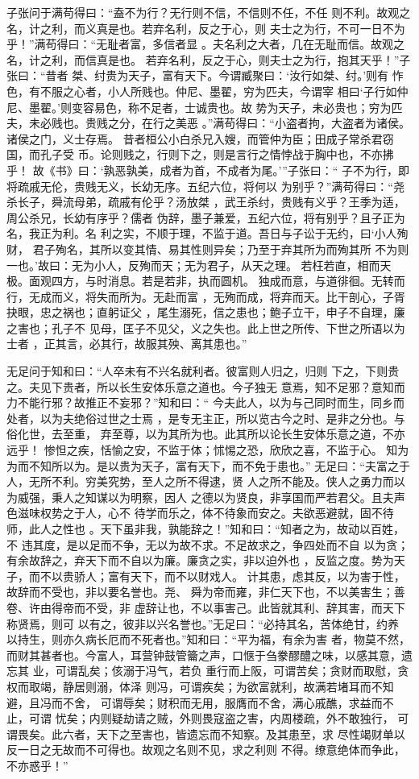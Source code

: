 \documentclass[a4paper,12pt,UTF8,twoside]{ctexbook}
\begin{document}
子张问于满苟得曰：“盍不为行？无行则不信，不信则不任，不任 则不利。故观之名，计之利，而义真是也。若弃名利，反之于心，则 夫士之为行，不可一日不为乎！”满苟得曰：“无耻者富，多信者显 。夫名利之大者，几在无耻而信。故观之名，计之利，而信真是也。 若弃名利，反之于心，则夫士之为行，抱其天乎！”子张曰：“昔者 桀、纣贵为天子，富有天下。今谓臧聚曰：‘汝行如桀、纣。’则有 怍色，有不服之心者，小人所贱也。仲尼、墨翟，穷为匹夫，今谓宰 相曰‘子行如仲尼、墨翟。’则变容易色，称不足者，士诚贵也。故 势为天子，未必贵也；穷为匹夫，未必贱也。贵贱之分，在行之美恶 。”满苟得曰：“小盗者拘，大盗者为诸侯。诸侯之门，义士存焉。 昔者桓公小白杀兄入嫂，而管仲为臣；田成子常杀君窃国，而孔子受 币。论则贱之，行则下之，则是言行之情悖战于胸中也，不亦拂乎！ 故《书》曰：‘孰恶孰美，成者为首，不成者为尾。’”子张曰：“ 子不为行，即将疏戚无伦，贵贱无义，长幼无序。五纪六位，将何以 为别乎？”满苟得曰：“尧杀长子，舜流母弟，疏戚有伦乎？汤放桀 ，武王杀纣，贵贱有义乎？王季为适，周公杀兄，长幼有序乎？儒者 伪辞，墨子兼爱，五纪六位，将有别乎？且子正为名，我正为利。名 利之实，不顺于理，不监于道。吾日与子讼于无约，曰‘小人殉财， 君子殉名，其所以变其情、易其性则异矣；乃至于弃其所为而殉其所 不为则一也。’故曰：无为小人，反殉而天；无为君子，从天之理。 若枉若直，相而天极。面观四方，与时消息。若是若非，执而圆机。 独成而意，与道徘徊。无转而行，无成而义，将失而所为。无赴而富 ，无殉而成，将弃而天。比干剖心，子胥抉眼，忠之祸也；直躬证父 ，尾生溺死，信之患也；鲍子立干，申子不自理，廉之害也；孔子不 见母，匡子不见父，义之失也。此上世之所传、下世之所语以为士者 ，正其言，必其行，故服其殃、离其患也。”

无足问于知和曰：“人卒未有不兴名就利者。彼富则人归之，归则 下之，下则贵之。夫见下贵者，所以长生安体乐意之道也。今子独无 意焉，知不足邪？意知而力不能行邪？故推正不妄邪？”知和曰：“ 今夫此人，以为与己同时而生，同乡而处者，以为夫绝俗过世之士焉 ，是专无主正，所以览古今之时、是非之分也。与俗化世，去至重， 弃至尊，以为其所为也。此其所以论长生安体乐意之道，不亦远乎！ 惨怛之疾，恬愉之安，不监于体；怵惕之恐，欣欣之喜，不监于心。 知为为而不知所以为。是以贵为天子，富有天下，而不免于患也。” 无足曰：“夫富之于人，无所不利。穷美究势，至人之所不得逮，贤 人之所不能及。侠人之勇力而以为威强，秉人之知谋以为明察，因人 之德以为贤良，非享国而严若君父。且夫声色滋味权势之于人，心不 待学而乐之，体不待象而安之。夫欲恶避就，固不待师，此人之性也 。天下虽非我，孰能辞之！”知和曰：“知者之为，故动以百姓，不 违其度，是以足而不争，无以为故不求。不足故求之，争四处而不自 以为贪；有余故辞之，弃天下而不自以为廉。廉贪之实，非以迫外也 ，反监之度。势为天子，而不以贵骄人；富有天下，而不以财戏人。 计其患，虑其反，以为害于性，故辞而不受也，非以要名誉也。尧、 舜为帝而雍，非仁天下也，不以美害生；善卷、许由得帝而不受，非 虚辞让也，不以事害己。此皆就其利、辞其害，而天下称贤焉，则可 以有之，彼非以兴名誉也。”无足曰：“必持其名，苦体绝甘，约养 以持生，则亦久病长厄而不死者也。”知和曰：“平为福，有余为害 者，物莫不然，而财其甚者也。今富人，耳营钟鼓管籥之声，口惬于刍豢醪醴之味，以感其意，遗忘其 业，可谓乱矣；侅溺于冯气，若负 重行而上阪，可谓苦矣；贪财而取慰，贪权而取竭，静居则溺，体泽 则冯，可谓疾矣；为欲富就利，故满若堵耳而不知避，且冯而不舍， 可谓辱矣；财积而无用，服膺而不舍，满心戚醮，求益而不止，可谓 忧矣；内则疑劫请之贼，外则畏寇盗之害，内周楼疏，外不敢独行， 可谓畏矣。此六者，天下之至害也，皆遗忘而不知察。及其患至，求 尽性竭财单以反一日之无故而不可得也。故观之名则不见，求之利则 不得。缭意绝体而争此，不亦惑乎！”
\end{document}

